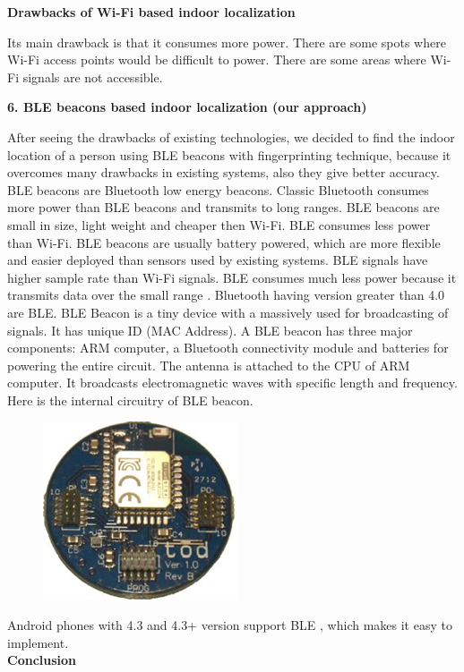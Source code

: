 \textbf{Drawbacks of Wi-Fi based indoor localization}

Its main drawback is that it consumes more power. There are some spots where Wi-Fi access points would be difficult to power. There are some areas where Wi-Fi signals are not accessible. \cite{cooper2016loco}

\textbf{6. BLE beacons based indoor localization (our approach)}

After seeing the drawbacks of existing technologies, we decided to find the indoor location of a person using BLE beacons with fingerprinting technique, because it overcomes many drawbacks in existing systems, also they give better accuracy.  BLE beacons are Bluetooth low energy beacons. Classic Bluetooth consumes more power than BLE beacons and transmits to long ranges. BLE beacons are small in size, light weight and cheaper then Wi-Fi. BLE consumes less power than Wi-Fi. BLE beacons are usually battery powered, which are more flexible and easier deployed than sensors used by existing systems. BLE signals have higher sample rate than Wi-Fi signals. BLE consumes much less power because it transmits data over the small range \cite{BLEguide}. Bluetooth having version greater than 4.0 are BLE. BLE Beacon is a tiny device with a massively used for broadcasting of signals. It has unique ID (MAC Address). A BLE beacon has three major components:  ARM computer, a Bluetooth connectivity module and batteries for powering the entire circuit. The antenna is attached to the CPU of ARM computer. It broadcasts electromagnetic waves with specific length and frequency. Here is the internal circuitry of BLE beacon.

\begin{figure}[h]
  		\centering
    		\includegraphics{./Figures/internalbeacon}
 		\end{figure}

Android phones with 4.3 and 4.3+ version support BLE \cite{BLEguide}, which makes it easy to implement. 
\\
\textbf{Conclusion}

